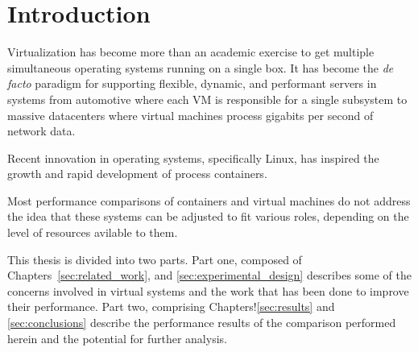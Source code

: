 \chapter{Introduction}
\label{cha:introduction}
\label{sec:introduction}
Virtualization has become more than an academic exercise to get multiple simultaneous operating systems running on a single box.  
It has become the \emph{de facto} paradigm for supporting flexible, dynamic, and performant servers in systems from automotive where each VM is responsible for a single subsystem to massive datacenters where virtual machines process gigabits per second of network data.

Recent innovation in operating systems, specifically Linux, has inspired the growth and rapid development of process containers.

Most performance comparisons of containers and virtual machines do not address the idea that these systems can be adjusted to fit various roles, depending on the level of resources avilable to them.  


This thesis is divided into two parts.
Part one, composed of Chapters~\ref{sec:related_work}, and \ref{sec:experimental_design} describes some of the concerns involved in virtual systems and the work that has been done to improve their performance.
Part two, comprising Chapters!\ref{sec:results} and \ref{sec:conclusions} describe the performance results of the comparison performed herein and the potential for further analysis.
